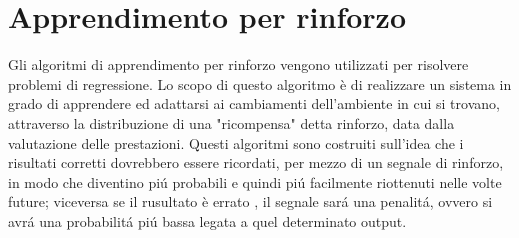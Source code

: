 \documentclass[a4paper,12pt,oneside]{book}
\begin{document}
\section{Apprendimento per rinforzo}
Gli algoritmi di apprendimento per rinforzo vengono utilizzati per risolvere problemi di regressione.
Lo scopo di questo algoritmo \`e di realizzare un sistema in grado di apprendere ed adattarsi ai cambiamenti dell'ambiente in cui si trovano, attraverso la distribuzione di una "ricompensa" detta rinforzo, data dalla valutazione delle prestazioni. Questi algoritmi sono costruiti sull'idea che i risultati corretti dovrebbero essere ricordati, per mezzo di un segnale di rinforzo, in modo che diventino pi\'{u} probabili e quindi pi\'{u} facilmente riottenuti nelle volte future; viceversa se il rusultato \`e errato , il segnale sar\'{a} una penalit\'{a}, ovvero si avr\'{a} una probabilit\'{a} pi\'{u} bassa legata a quel determinato output.\cite{rinforzo}
\end{document}
